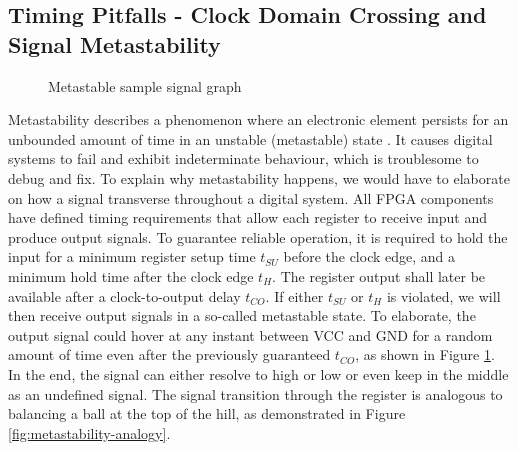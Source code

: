 \documentclass[a4paper]{report}
\begin{document}
\subsection{Timing Pitfalls - Clock Domain Crossing and Signal Metastability}
\label{section:implementation-hardware-implementation-metastability}

\begin{figure}[h!]
  \caption{Metastable sample signal graph \cite{stephenson-2009}}
  \label{fig:metastability-clock}
\end{figure}

Metastability describes a phenomenon where an electronic element persists for an unbounded amount of time in an unstable (metastable) state \cite{chaney-1973}. It causes digital systems to fail and exhibit indeterminate behaviour, which is troublesome to debug and fix. To explain why metastability happens, we would have to elaborate on how a signal transverse throughout a digital system. All FPGA components have defined timing requirements that allow each register to receive input and produce output signals. To guarantee reliable operation, it is required to hold the input for a minimum register setup time $t_{SU}$ before the clock edge, and a minimum hold time after the clock edge $t_{H}$. The register output shall later be available after a clock-to-output delay $t_{CO}$. If either $t_{SU}$ or $t_{H}$ is violated, we will then receive output signals in a so-called metastable state. To elaborate, the output signal could hover at any instant between VCC and GND for a random amount of time even after the previously guaranteed $t_{CO}$, as shown in Figure \ref{fig:metastability-clock}. In the end, the signal can either resolve to high or low or even keep in the middle as an undefined signal. The signal transition through the register is analogous to balancing a ball at the top of the hill, as demonstrated in Figure \ref{fig:metastability-analogy}.
\end{document}
